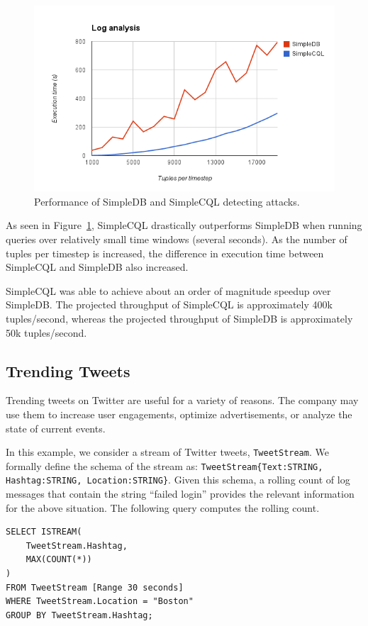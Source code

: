 \documentclass[a4paper, 10pt, conference]{IEEEconf}
\begin{document}
\begin{figure}[h!]
    \centering
    \centerline{\includegraphics[totalheight=5cm]{attack.png}}
    \caption{Performance of SimpleDB and SimpleCQL detecting attacks.}
    \label{fig:attack}
\end{figure}

As seen in Figure~\ref{fig:attack}, SimpleCQL drastically outperforms SimpleDB when running queries over relatively small time windows (several seconds).  As the number of tuples per timestep is increased, the difference in execution time between SimpleCQL and SimpleDB also increased.  

SimpleCQL was able to achieve about an order of magnitude speedup over SimpleDB.  The projected throughput of SimpleCQL is approximately 400k tuples/second, whereas the projected throughput of SimpleDB is approximately 50k tuples/second.

\subsection{Trending Tweets}
Trending tweets on Twitter are useful for a variety of reasons.  The company may use them to increase user engagements, optimize advertisements, or analyze the state of current events.  

In this example, we consider a stream of Twitter tweets, \texttt{TweetStream}. We formally define the schema of the stream as: \texttt{TweetStream\{Text:STRING, Hashtag:STRING, Location:STRING\}}.  Given this schema, a rolling count of log messages that contain the string ``failed login'' provides the relevant information for the above situation.  The following query computes the rolling count.

\begin{lstlisting}
SELECT ISTREAM(
    TweetStream.Hashtag,
    MAX(COUNT(*))
)
FROM TweetStream [Range 30 seconds]
WHERE TweetStream.Location = "Boston"
GROUP BY TweetStream.Hashtag;
\end{lstlisting}
\end{document}
